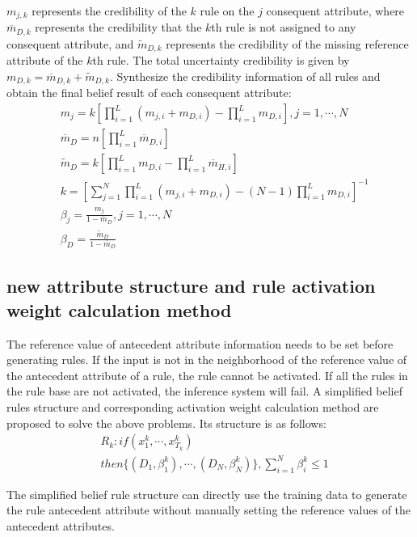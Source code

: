 \documentclass{ieeeaccess}
\begin{document}
$m_{j,k}$ represents the credibility of the $k$ rule on the $j$ consequent attribute,
where $\overline{m}_{D,k}$ represents the credibility that the $k$th rule is not assigned to any consequent attribute,
and $\widetilde{m}_{D,k}$  represents the credibility of the missing reference attribute of the $k$th rule.
The total uncertainty credibility is given by $m_{D,k}=\overline{m}_{D,k}+\widetilde{m}_{D,k}$.
Synthesize the credibility information of all rules and obtain the final belief result of each consequent attribute:
\begin{align}
     & m_j=k[\prod_{i=1}^L(m_{j,i}+m_{D,i})-\prod_{i=1}^Lm_{D,i}],j=1,\cdots,N       \\
     & \overline{m}_D=n[\prod_{i=1}^L\overline{m}_{D,i}]                             \\
     & \widetilde{m}_D=k[\prod_{i=1}^Lm_{D,i}-\prod_{i=1}^L\overline{m}_{H,i}]       \\
     & k=[\sum_{j=1}^N\prod_{i=1}^L(m_{j,i}+m_{D,i})-(N-1)\prod_{i=1}^Lm_{D,i}]^{-1} \\
     & \beta_j=\frac{m_j}{1-\overline{m}_D},j=1,\cdots,N                             \\
     & \beta_D=\frac{\widetilde{m}_D}{1-\overline{m}_D}
\end{align}

\subsection{new attribute structure and rule activation weight calculation method}
The reference value of antecedent attribute information needs to be set before generating rules.
If the input is not in the neighborhood of the reference value of the antecedent attribute of a rule, the rule cannot be activated.
If all the rules in the rule base are not activated, the inference system will fail.
A simplified belief rules structure and corresponding activation weight calculation method are proposed to solve the above problems.
Its structure is as follows:
\begin{equation}
    \begin{split}
        &R_k:if(x_1^k , \cdots , x_{T_k}^k)\\
        &then\{(D_1,\beta_1^k),\cdots,(D_N,\beta_N^k)\},\sum_{i=1}^N\beta_i^k\leq1
    \end{split}
\end{equation}

The simplified belief rule structure can directly use the training data to generate the rule antecedent attribute without manually setting the reference values of the antecedent attributes.
\end{document}
